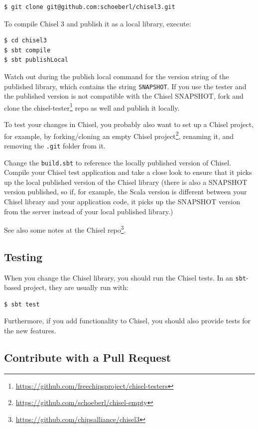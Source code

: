 \documentclass[%
    10pt,
    headinclude, footexclude,
    openright, %
    notitlepage,
    cleardoubleempty,
    headsepline,
    pointlessnumbers,
    bibtotoc, idxtotoc,
    ]{scrbook}
\newcommand{\code}[1]{{\small{\texttt{#1}}}}
\newcommand{\myref}[2]{\href{#1}{#2}}
\renewcommand{\myref}[2]{{#2}{\footnote{\url{#1}}}}
\begin{document}
\begin{verbatim}
$ git clone git@github.com:schoeberl/chisel3.git
\end{verbatim}

To compile Chisel 3 and publish it as a local library, execute:
\begin{verbatim}
$ cd chisel3
$ sbt compile
$ sbt publishLocal
\end{verbatim}

Watch out during the publish local command for the version string of the published
library, which contains the string \code{SNAPSHOT}.
If you use the tester and the published version is not compatible with the Chisel
SNAPSHOT, fork and clone the \myref{https://github.com/freechipsproject/chisel-testers}{chisel-tester}
repo as well and publish it locally.

To test your changes in Chisel, you probably also want to set up a Chisel project,
for example, by forking/cloning an \myref{https://github.com/schoeberl/chisel-empty}{empty Chisel project},
renaming it, and removing the \code{.git} folder from it.

Change the \code{build.sbt} to reference the locally published version of Chisel.
Compile your Chisel test application and take a close look to ensure that it picks up the local published
version of the Chisel library (there is also a SNAPSHOT version published, so if, for example,
the Scala version is different between your Chisel library and your application code,
it picks up the SNAPSHOT version from the server instead of your local published
library.)

See also \myref{https://github.com/chipsalliance/chisel3}{some notes
at the Chisel repo}.

\subsection{Testing}

When you change the Chisel library, you should run the Chisel tests.
In an \code{sbt}-based project, they are usually run with:

\begin{verbatim}
$ sbt test
\end{verbatim}

Furthermore, if you add functionality to Chisel, you should also provide tests for the
new features.

\subsection{Contribute with a Pull Request}
\end{document}
